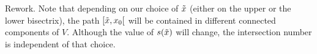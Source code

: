 \documentclass[main.tex]{subfiles}
\begin{document}
\begin{rmk}
  \todo Rework. Note that depending on our choice of $\tilde{x}$ (either on the upper or the lower bisectrix), the path
  $[\tilde{x},x_0[$ will be contained in different connected components of $V$. Although the value of
  $s(\tilde{x})$ will change, the intersection number is independent of that choice.
\end{rmk}



%    
\end{document}
